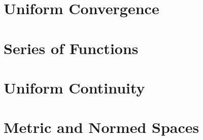 \documentclass[british,11pt,a4paper]{report}
\begin{document}
\maketitle
\tableofcontents

\chapter{Uniform Convergence}

\chapter{Series of Functions}

\chapter{Uniform Continuity}

\chapter{Metric and Normed Spaces}

\end{document}
